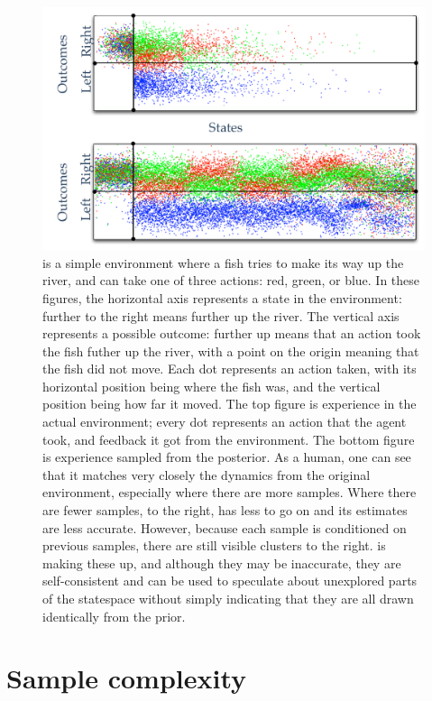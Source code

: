\begin{figure}[t]
\begin{center}
\includegraphics[width=0.9\linewidth]{figures/riverswim.pdf}
\caption{ is a simple environment where a fish tries to make its way up the river, and can take one of three actions: red, green, or blue. In these figures, the horizontal axis represents a state in the environment: further to the right means further up the river. The vertical axis represents a possible outcome: further up means that an action took the fish futher up the river, with a point on the origin meaning that the fish did not move. Each dot represents an action taken, with its horizontal position being where the fish was, and the vertical position being how far it moved. The top figure is experience in the actual environment; every dot represents an action that the agent took, and feedback it got from the environment. The bottom figure is experience sampled from the  posterior. As a human, one can see that it matches very closely the dynamics from the original environment, especially where there are more samples. Where there are fewer samples, to the right,  has less to go on and its estimates are less accurate. However, because each sample is conditioned on previous samples, there are still visible clusters to the right.  is making these up, and although they may be inaccurate, they are self-consistent and can be used to speculate about unexplored parts of the statespace without simply indicating that they are all drawn identically from the prior.}
\label{sec:models:riverswim}
\end{center}
\end{figure}


\section{Sample complexity}
\label{sec:models:complex}



